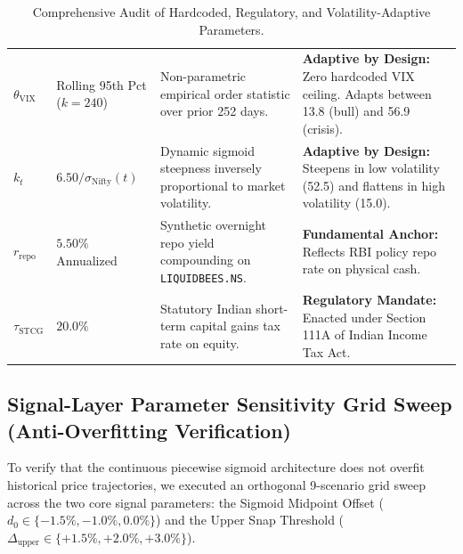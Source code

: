\documentclass[11pt,a4paper]{article}
\begin{document}
\begin{table}[H]
\begin{tabularx}{\textwidth}{llp{3.8cm}X}
\addlinespace
$\theta_{\text{VIX}}$ & Rolling 95th Pct ($k=240$) & Non-parametric empirical order statistic over prior 252 days. & \textbf{Adaptive by Design:} Zero hardcoded VIX ceiling. Adapts between 13.8 (bull) and 56.9 (crisis). \\
\addlinespace
$k_t$ & $6.50 / \sigma_{\text{Nifty}}(t)$ & Dynamic sigmoid steepness inversely proportional to market volatility. & \textbf{Adaptive by Design:} Steepens in low volatility (52.5) and flattens in high volatility (15.0). \\
\addlinespace
$r_{\text{repo}}$ & $5.50\%$ Annualized & Synthetic overnight repo yield compounding on \texttt{LIQUIDBEES.NS}. & \textbf{Fundamental Anchor:} Reflects RBI policy repo rate on physical cash. \\
\addlinespace
$\tau_{\text{STCG}}$ & $20.0\%$ & Statutory Indian short-term capital gains tax rate on equity. & \textbf{Regulatory Mandate:} Enacted under Section 111A of Indian Income Tax Act. \\
\bottomrule
\end{tabularx}
\caption{Comprehensive Audit of Hardcoded, Regulatory, and Volatility-Adaptive Parameters.}
\end{table}

\subsection{Signal-Layer Parameter Sensitivity Grid Sweep (Anti-Overfitting Verification)}
To verify that the continuous piecewise sigmoid architecture does not overfit historical price trajectories, we executed an orthogonal 9-scenario grid sweep across the two core signal parameters: the Sigmoid Midpoint Offset ($d_0 \in \{-1.5\%, -1.0\%, 0.0\%\}$) and the Upper Snap Threshold ($\Delta_{\text{upper}} \in \{+1.5\%, +2.0\%, +3.0\%\}$).
\end{document}
